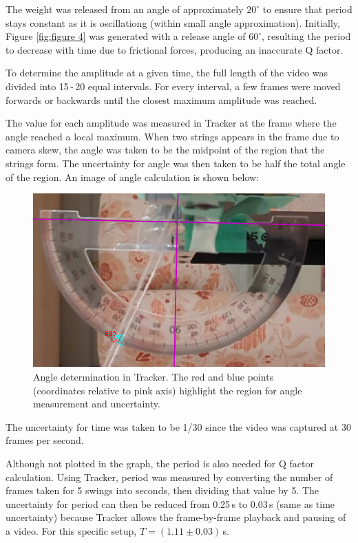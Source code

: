 \documentclass[11pt]{article}
\begin{document}
\begin{multicols}{2}
The weight was released from an angle of approximately $20^\circ$ to ensure that period stays constant as it is oscillationg (within small angle approximation). Initially, Figure \ref{fig:figure 4} was generated with a release angle of $60^\circ$, resulting the period to decrease with time due to frictional forces, producing an inaccurate Q factor.

To determine the amplitude at a given time, the full length of the video was divided into 15\,-\,20 equal intervals. For every interval, a few frames were moved forwards or backwards until the closest maximum amplitude was reached.

The value for each amplitude was measured in Tracker \cite{tracker} at the frame where the angle reached a local maximum. When two strings appears in the frame due to camera skew, the angle was taken to be the midpoint of the region that the strings form. The uncertainty for angle was then taken to be half the total angle of the region. An image of angle calculation is shown below:

\begin{figure}[H]
    \centering
    \includegraphics[width=\linewidth]{../figures/tracker.png}
    \caption{\centering Angle determination in Tracker. The red and blue points (coordinates relative to pink axis) highlight the region for angle measurement and uncertainty.}
    \label{fig:figure5}
\end{figure}

The uncertainty for time was taken to be 1/30 since the video was captured at 30 frames per second.

Although not plotted in the graph, the period is also needed for Q factor calculation. Using Tracker, period was measured by converting the number of frames taken for 5 swings into seconds, then dividing that value by 5. The uncertainty for period can then be reduced from 0.25\,s to 0.03\,s (same as time uncertainty) because Tracker allows the frame-by-frame playback and pausing of a video. For this specific setup, $T = (1.11 \pm 0.03)$\,s.


\end{multicols}
\end{document}
